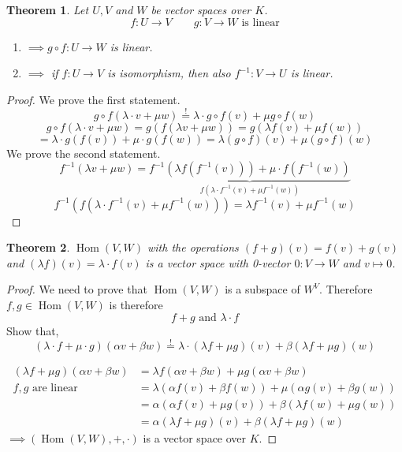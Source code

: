 \documentclass[a4paper,landscape,twocolumn]{article}
\newtheorem{theorem}{Theorem}[section]
\DeclareMathOperator\Hom{Hom} %
\begin{document}
\begin{theorem}
  Let $U, V$ and $W$ be vector spaces over $K$.
  \[ f: U \rightarrow V \qquad g: V \rightarrow W \text{ is linear} \]
  \begin{enumerate}
    \item $\implies g \circ f: U \rightarrow W$ is linear.
    \item $\implies$ if $f: U \rightarrow V$ is isomorphism,
      then also $f^{-1}: V \rightarrow U$ is linear.
  \end{enumerate}
\end{theorem}
\begin{proof}
  We prove the first statement.
  \[ g \circ f (\lambda \cdot v + \mu w) \stackrel{!}{=} \lambda \cdot g \circ f(v) + \mu g \circ f(w) \]
  \[ g \circ f (\lambda \cdot v + \mu w) = g(f(\lambda v + \mu w)) = g(\lambda f(v) + \mu f(w)) \]
  \[ = \lambda \cdot g(f(v)) + \mu \cdot g(f(w)) = \lambda (g \circ f) (v) + \mu (g \circ f) (w) \]
  We prove the second statement.
  \[ f^{-1}(\lambda v + \mu w) = \underbrace{f^{-1}(\lambda f(f^{-1}(v))) + \mu \cdot f(f^{-1}(w))}_{f(\lambda \cdot f^{-1}(v) + \mu f^{-1}(w))} \]
  \[ f^{-1}(f(\lambda \cdot f^{-1}(v) + \mu f^{-1}(w))) = \lambda f^{-1}(v) + \mu f^{-1}(w) \]
\end{proof}

\begin{theorem}
  \label{satz-5-7}
  $\Hom(V, W)$ with the operations $(f + g)(v) = f(v) + g(v)$
  and $(\lambda f)(v) = \lambda \cdot f(v)$ is a vector space with 0-vector $0: V \rightarrow W$ and $v \mapsto 0$.
\end{theorem}
\begin{proof}
  We need to prove that $\Hom(V, W)$ is a subspace of $W^V$.
  Therefore $f, g \in \Hom(V, W)$ is therefore
  \[ f + g \text{ and } \lambda \cdot f \]
  Show that,
  \[ (\lambda \cdot f + \mu \cdot g) (\alpha v + \beta w) \stackrel{!}{=} \lambda \cdot (\lambda f + \mu g) (v) + \beta (\lambda f + \mu g) (w) \]

  \begin{align*}
    (\lambda f + \mu g) (\alpha v + \beta w) &= \lambda f(\alpha v + \beta w) + \mu g(\alpha v + \beta w) \\
    f, g \text{ are linear } &= \lambda (\alpha f(v) + \beta f(w)) + \mu (\alpha g(v) + \beta g(w)) \\
      &= \alpha \left(\alpha f(v) + \mu g(v)\right) + \beta(\lambda f(w) + \mu g(w)) \\
      &= \alpha (\lambda f + \mu g)(v) + \beta (\lambda f + \mu g)(w)
  \end{align*}
  $\implies (\Hom(V, W), +, \cdot)$ is a vector space over $K$.
\end{proof}
\end{document}
